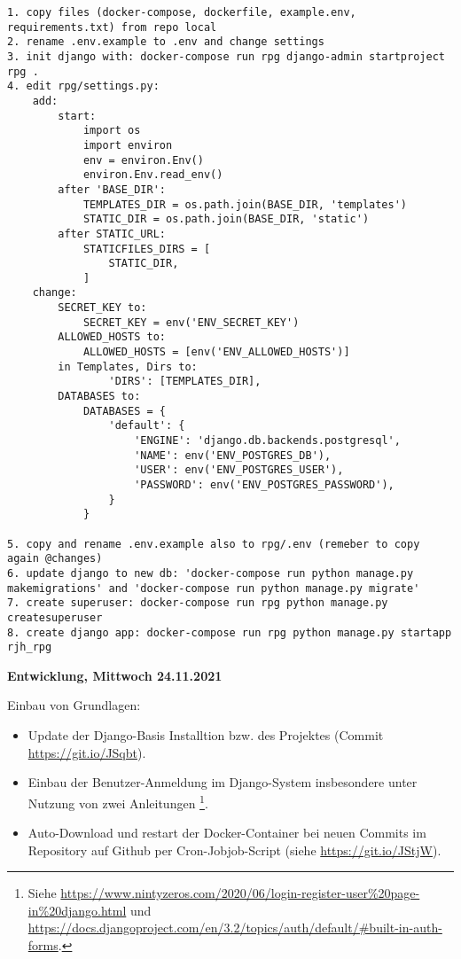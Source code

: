 \begin{lstlisting}
1. copy files (docker-compose, dockerfile, example.env, requirements.txt) from repo local
2. rename .env.example to .env and change settings 
3. init django with: docker-compose run rpg django-admin startproject rpg .
4. edit rpg/settings.py:
    add:
        start:
            import os
            import environ
            env = environ.Env()
            environ.Env.read_env()
        after 'BASE_DIR':
            TEMPLATES_DIR = os.path.join(BASE_DIR, 'templates')
            STATIC_DIR = os.path.join(BASE_DIR, 'static')
        after STATIC_URL:
            STATICFILES_DIRS = [
                STATIC_DIR,
            ]
    change: 
        SECRET_KEY to:
            SECRET_KEY = env('ENV_SECRET_KEY')
        ALLOWED_HOSTS to:
            ALLOWED_HOSTS = [env('ENV_ALLOWED_HOSTS')]
        in Templates, Dirs to:
                'DIRS': [TEMPLATES_DIR],
        DATABASES to:
            DATABASES = {
                'default': {
                    'ENGINE': 'django.db.backends.postgresql',
                    'NAME': env('ENV_POSTGRES_DB'),
                    'USER': env('ENV_POSTGRES_USER'),
                    'PASSWORD': env('ENV_POSTGRES_PASSWORD'),
                }
            }

5. copy and rename .env.example also to rpg/.env (remeber to copy again @changes)
6. update django to new db: 'docker-compose run python manage.py makemigrations' and 'docker-compose run python manage.py migrate'
7. create superuser: docker-compose run rpg python manage.py createsuperuser
8. create django app: docker-compose run rpg python manage.py startapp rjh_rpg 
\end{lstlisting}




\textbf{Entwicklung, Mittwoch 24.11.2021}

Einbau von Grundlagen: 
\begin{itemize}
    \item Update der Django-Basis Installtion bzw. des Projektes (Commit \url{https://git.io/JSqbt}). 
    \item Einbau der Benutzer-Anmeldung im Django-System insbesondere unter Nutzung von zwei Anleitungen   \footnote{Siehe  \url{https://www.nintyzeros.com/2020/06/login-register-user\%20page-in\%20django.html} und \url{https://docs.djangoproject.com/en/3.2/topics/auth/default/\#built-in-auth-forms}.}.
    \item Auto-Download und restart der Docker-Container bei neuen Commits im Repository auf Github per Cron-Jobjob-Script (siehe \url{https://git.io/JStjW}).
\end{itemize}





